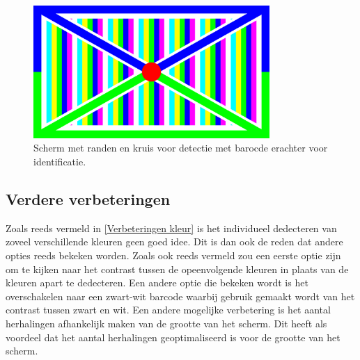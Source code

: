 \begin{figure}[h!]
	\center
	\includegraphics[width=0.8\textwidth]{img/screen.png}
	\caption{Scherm met randen en kruis voor detectie met barocde erachter voor identificatie.}
	\label{html}
	\label{scherm}
\end{figure}

\subsection{Verdere verbeteringen}
Zoals reeds vermeld in \ref{Verbeteringen kleur} is het individueel dedecteren van zoveel verschillende kleuren geen goed idee. Dit is dan ook de reden dat andere opties reeds bekeken worden. Zoals ook reeds vermeld zou een eerste optie zijn om te kijken naar het contrast tussen de opeenvolgende kleuren in plaats van de kleuren apart te dedecteren. Een andere optie die bekeken wordt is het overschakelen naar een zwart-wit barcode waarbij gebruik gemaakt wordt van het contrast tussen zwart en wit. Een andere mogelijke verbetering is het aantal herhalingen afhankelijk maken van de grootte van het scherm. Dit heeft als voordeel dat het aantal herhalingen geoptimaliseerd is voor de grootte van het scherm.
